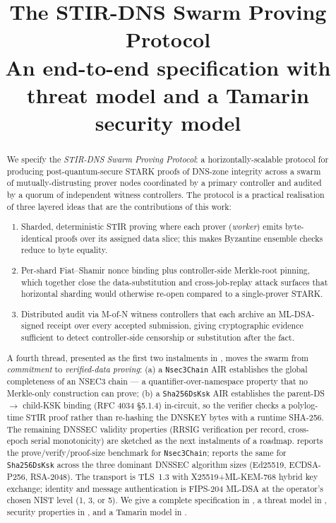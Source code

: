 \documentclass[11pt,a4paper]{article}
\title{The STIR-DNS Swarm Proving Protocol \\
       \large An end-to-end specification with threat model and a Tamarin
              security model}
\author{}
\date{}
\theoremstyle{definition}
\theoremstyle{plain}
\begin{document}
\maketitle

\begin{abstract}
We specify the \emph{STIR-DNS Swarm Proving Protocol}: a horizontally-scalable
protocol for producing post-quantum-secure STARK proofs of DNS-zone integrity
across a swarm of mutually-distrusting prover nodes coordinated by a primary
controller and audited by a quorum of independent witness controllers.  The
protocol is a practical realisation of three layered ideas that are the
contributions of this work:
\begin{enumerate}[leftmargin=*]
  \item Sharded, deterministic STIR proving where each prover (\emph{worker})
        emits byte-identical proofs over its assigned data slice; this
        makes Byzantine ensemble checks reduce to byte equality.
  \item Per-shard Fiat--Shamir nonce binding plus controller-side Merkle-root
        pinning, which together close the data-substitution and
        cross-job-replay attack surfaces that horizontal sharding would
        otherwise re-open compared to a single-prover STARK.
  \item Distributed audit via M-of-N witness controllers that each archive an
        ML-DSA-signed receipt over every accepted submission, giving
        cryptographic evidence sufficient to detect controller-side
        censorship or substitution after the fact.
\end{enumerate}
A fourth thread, presented as the first two instalments in
, moves the swarm from \emph{commitment} to
\emph{verified-data proving}: (a) a \texttt{Nsec3Chain} AIR
establishes the global completeness of an NSEC3 chain — a
quantifier-over-namespace property that no Merkle-only construction
can prove; (b) a \texttt{Sha256DsKsk} AIR establishes the parent-DS
$\to$ child-KSK binding (RFC 4034 \S5.1.4) in-circuit, so the
verifier checks a polylog-time STIR proof rather than re-hashing the
DNSKEY bytes with a runtime SHA-256.  The remaining DNSSEC validity
properties (RRSIG verification per record, cross-epoch serial
monotonicity) are sketched as the next instalments of a roadmap.
 reports the prove/verify/proof-size benchmark
for \texttt{Nsec3Chain};  reports the same for
\texttt{Sha256DsKsk} across the three dominant DNSSEC algorithm sizes
(Ed25519, ECDSA-P256, RSA-2048).
The transport is TLS~1.3 with X25519+ML-KEM-768 hybrid key exchange; identity
and message authentication is FIPS-204 ML-DSA at the operator's chosen NIST
level (1, 3, or 5).  We give a complete specification in
, a threat model in , security
properties in , and a Tamarin model in
.
\end{abstract}
\end{document}
